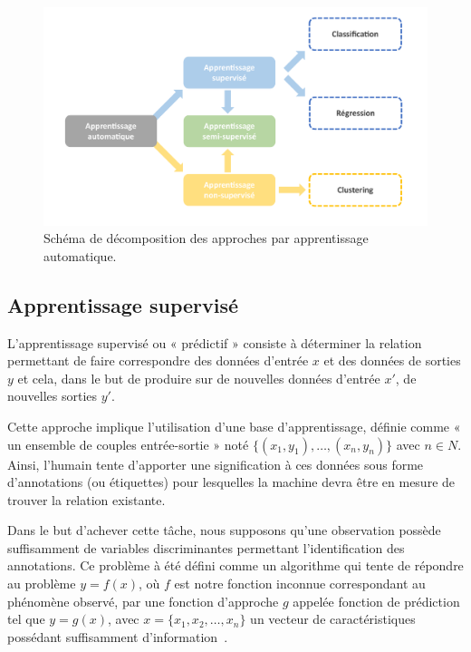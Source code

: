  \begin{figure}[H]
    \centering 
    \includegraphics[width=\linewidth]{contents/chapter_3/resources/scheme_machine_learning.pdf}
    \caption{Schéma de décomposition des approches par apprentissage automatique.}
    \label{fig:scheme_machine_learning}
\end{figure}

\subsection{Apprentissage supervisé}
\label{sec:supervised_learning}
L’apprentissage supervisé ou « prédictif » consiste à déterminer la relation permettant de faire correspondre des données d’entrée $x$ et des données de sorties $y$ et cela, dans le but de produire sur de nouvelles données d’entrée $x'$, de nouvelles sorties $y'$.\par

Cette approche implique l’utilisation d’une base d’apprentissage, définie comme « un ensemble de couples entrée-sortie » noté $\{(x_1,y_1 ),\ldots,(x_n,y_n )\}$ avec $n \in N$. Ainsi, l’humain tente d'apporter une signification à ces données sous forme d'annotations (ou étiquettes) pour lesquelles la machine devra être en mesure de trouver la relation existante.\par

Dans le but d'achever cette tâche, nous supposons qu'une observation possède suffisamment de variables discriminantes permettant l'identification des annotations. Ce problème à été défini comme un algorithme qui tente de répondre au problème $y=f(x)$, où $f$ est notre fonction inconnue correspondant au phénomène observé, par une fonction d’approche $g$ appelée fonction de prédiction tel que $y=g(x)$, avec $x=\{x_1,x_2,\ldots,x_n\}$ un vecteur de caractéristiques possédant suffisamment d'information~\cite{foulds2010}.\par 

